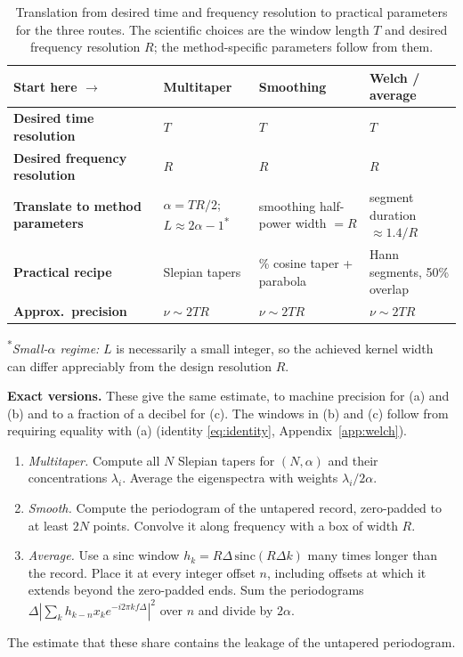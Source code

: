 \documentclass[10pt,twocolumn]{article}
\begin{document}
\begin{table}[t]
\centering
\caption{Translation from desired time and frequency resolution to practical parameters for the three routes. The scientific choices are the window length $T$ and desired frequency resolution $R$; the method-specific parameters follow from them.}
\label{tab:resolution_translation}
\renewcommand{\arraystretch}{1.20}
\begin{tabularx}{\textwidth}{>{\raggedright\arraybackslash}p{} >{\raggedright\arraybackslash}X >{\raggedright\arraybackslash}X >{\raggedright\arraybackslash}X}
\toprule
\textbf{Start here $\rightarrow$} & \textbf{Multitaper} & \textbf{Smoothing} & \textbf{Welch / average} \\
\midrule
\textbf{Desired time resolution} & $T$ & $T$ & $T$ \\
\textbf{Desired frequency resolution} & $R$ & $R$ & $R$ \\
\addlinespace
\textbf{Translate to method parameters} & $\alpha=TR/2$;\quad $L\approx2\alpha-1$\textsuperscript{*} & smoothing half-power width $=R$ & segment duration $\approx1.4/R$ \\
\textbf{Practical recipe} & Slepian tapers & 25\% cosine taper + parabola & Hann segments, 50\% overlap \\
\addlinespace
\textbf{Approx.\ precision} & $\nu\sim2TR$ & $\nu\sim2TR$ & $\nu\sim2TR$ \\
\bottomrule
\end{tabularx}

\vspace{2pt}
\parbox{\textwidth}{\footnotesize\textsuperscript{*}\textit{Small-$\alpha$ regime:} $L$ is necessarily a small integer, so the achieved kernel width can differ appreciably from the design resolution $R$.}
\end{table}

\begin{framed}
\noindent\textbf{Exact versions.} These give the same estimate, to machine precision for (a) and (b) and to a fraction of a decibel for (c). The windows in (b) and (c) follow from requiring equality with (a) (identity \eqref{eq:identity}, Appendix~\ref{app:welch}).
\begin{enumerate}
\item[(a)] \emph{Multitaper.} Compute all $N$ Slepian tapers for $(N,\alpha)$ and their concentrations $\lambda_i$. Average the eigenspectra with weights $\lambda_i/2\alpha$.
\item[(b)] \emph{Smooth.} Compute the periodogram of the untapered record, zero-padded to at least $2N$ points. Convolve it along frequency with a box of width $R$.
\item[(c)] \emph{Average.} Use a sinc window $h_k=R\Delta\,\mathrm{sinc}(R\Delta k)$ many times longer than the record. Place it at every integer offset $n$, including offsets at which it extends beyond the zero-padded ends. Sum the periodograms $\Delta|\sum_kh_{k-n}x_ke^{-i2\pi kf\Delta}|^2$ over $n$ and divide by $2\alpha$.
\end{enumerate}
The estimate that these share contains the leakage of the untapered periodogram.
\end{framed}
\end{document}
